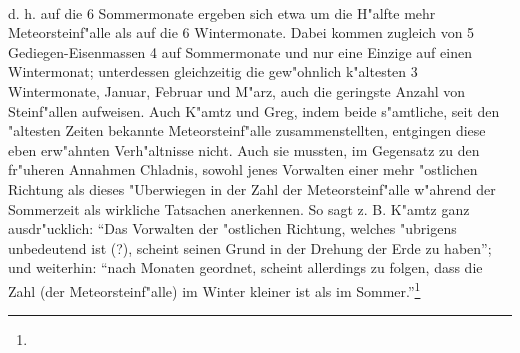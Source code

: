\documentclass[a4paper, 8pt, oneside, polutonikogreek, german]{article}
\begin{document}
\paragraph{}
d. h. auf die 6 Sommermonate ergeben sich etwa um die H"alfte mehr Meteorsteinf"alle als auf die 6 Wintermonate. Dabei kommen zugleich von 5 Gediegen-Eisenmassen 4 auf Sommermonate und nur eine Einzige auf einen Wintermonat; unterdessen gleichzeitig die gew"ohnlich k"altesten 3 Wintermonate, Januar, Februar und M"arz, auch die geringste Anzahl von Steinf"allen aufweisen. Auch K"amtz und Greg, indem beide s"amtliche, seit den "altesten Zeiten bekannte Meteorsteinf"alle zusammenstellten, entgingen diese eben erw"ahnten Verh"altnisse nicht. Auch sie mussten, im Gegensatz zu den fr"uheren Annahmen Chladnis, sowohl jenes Vorwalten einer mehr "ostlichen Richtung als dieses "Uberwiegen in der Zahl der Meteorsteinf"alle w"ahrend der Sommerzeit als wirkliche Tatsachen anerkennen. So sagt z. B. K"amtz ganz ausdr"ucklich: "`Das Vorwalten der "ostlichen Richtung, welches "ubrigens unbedeutend ist (?), scheint seinen Grund in der Drehung der Erde zu haben"'; und weiterhin: "`nach Monaten geordnet, scheint allerdings zu folgen, dass die Zahl (der Meteorsteinf"alle) im Winter kleiner ist als im Sommer."'\footnote{}
\end{document}
